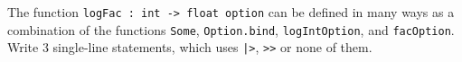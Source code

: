 The function \lstinline{logFac : int -> float option} can be defined in many ways as a combination of the functions \lstinline{Some}, \lstinline{Option.bind}, \lstinline{logIntOption}, and \lstinline{facOption}. Write 3 single-line statements, which uses \lstinline{|>}, \lstinline{>>} or none of them.